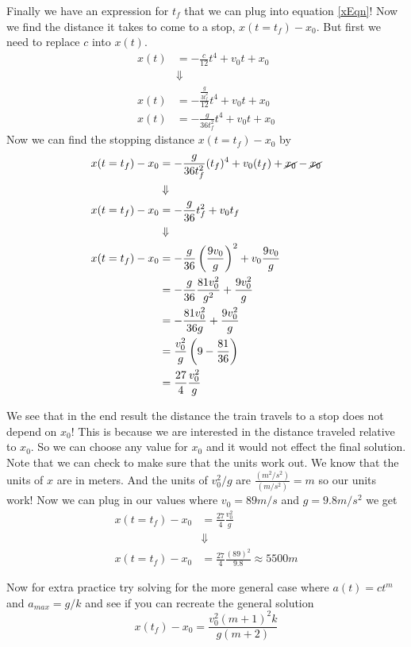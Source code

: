 \documentclass[11pt]{article}
\begin{document}
Finally we have an expression for $t_f$ that we can plug into equation \ref{xEqn}! Now we 
find the distance it takes to come to a stop, $x(t=t_f) - x_0$. But first we need to
replace $c$ into $x(t)$.
\begin{align*}
x(t) &= -\frac{c}{12}t^4 + v_0t + x_0\\
&\Downarrow\\
x(t) &= -\frac{\frac{g}{3t_f^2}}{12}t^4 + v_0t + x_0\\
x(t) &= -\frac{g}{36t_f^2}t^4 + v_0t + x_0
\end{align*}
Now we can find the stopping distance $x(t=t_f) - x_0$ by
\begin{align*}
x(t=t_f) - x_0 &= -\frac{g}{36t_f^2}(t_f)^4 + v_0(t_f) + \cancel{x_0} - \cancel{x_0}\\
&\Downarrow\\
x(t=t_f) - x_0 &= -\frac{g}{36}t_f^2 + v_0t_f\\
&\Downarrow\\
x(t=t_f) - x_0 &= -\frac{g}{36}\left(\frac{9v_0}{g}\right)^2 + v_0\frac{9v_0}{g}\\
&= -\frac{g}{36}\frac{81v_0^2}{g^2} + \frac{9v_0^2}{g}\\
&= -\frac{81v_0^2}{36g}  + \frac{9v_0^2}{g}\\
&= \frac{v_0^2}{g}\left(9-\frac{81}{36}\right)\\
&= \frac{27}{4}\frac{v_0^2}{g}
\end{align*}

We see that in the end result the distance the train travels to a stop does not depend on 
$x_0$! This is because we are interested in the distance traveled relative to $x_0$. So we
can choose any value for $x_0$ and it would not effect the final solution. 
Note that we can check to make sure that the units work out. We know that the units of $x$ 
are in meters. And the units of $v_0^2/g$ are $\frac{(m^2/s^2)}{(m/s^2)} = m$ so our units
work! Now we can plug in our values where $v_0 = 89\unit{m/s}$ and $g=9.8\unit{m/s^2}$ we 
get
\begin{align*}
x(t=t_f) - x_0 &= \frac{27}{4}\frac{v_0^2}{g}\\
&\Downarrow\\
x(t=t_f) - x_0 &= \frac{27}{4}\frac{(89)^2}{9.8} \approx 5500\unit{m}
\end{align*}

Now for extra practice try solving for the more general case where $a(t) = ct^{m}$ and 
$a_{max} = g/k$ and see if you can recreate the general solution
$$x(t_f) - x_0 = \frac{v_0^2(m+1)^2k}{g(m+2)}$$
\end{document}
